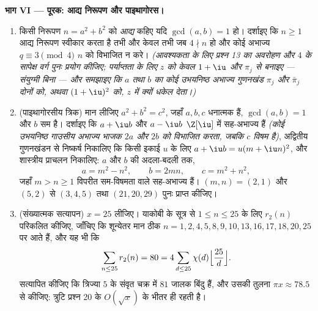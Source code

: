 \begin{problem}[{सप्ताहांत समस्या --- दो वर्गों के योग, $\Z[\iu]$ के
माध्यम से}]
\medskip
\noindent\textbf{भाग VI --- पूरक: आद्य निरूपण और पाइथागोरस।}
\begin{enumerate}[resume]
  \item किसी निरूपण $n = a^2 + b^2$ को \emph{आद्य} कहिए यदि $\gcd(a, b) = 1$ हो।
        दर्शाइए कि $n \geq 1$ आद्य निरूपण स्वीकार करता है तभी और केवल
        तभी जब $4 \nmid n$ हो और कोई अभाज्य $q \equiv 3 \pmod 4$ $n$ को विभाजित न
        करे। \emph{(आवश्यकता के लिए प्रश्न 13 का अवरोहण और
        $4$ के सापेक्ष वर्ग पुनः प्रयोग कीजिए; पर्याप्तता के
        लिए $z$ को केवल $1 + \iu$ और $\pi_j$ से बनाइए --- संयुग्मी
        बिना --- और समझाइए कि $a$ तथा $b$ का कोई उभयनिष्ठ
        अभाज्य गुणनखंड $\pi_j$ और $\bar\pi_j$ दोनों को, अथवा $(1+\iu)^2$ को,
        $z$ में क्यों धकेल देता।)}
  \item (पाइथागोरसीय त्रिक) मान लीजिए $a^2 + b^2 = c^2$, जहाँ $a, b,
        c$ धनात्मक
        हैं, $\gcd(a, b) = 1$ और $b$ सम है। दर्शाइए कि $a + \iu b$ और $a - \iu b$
        $\Z[\iu]$ में सह-अभाज्य हैं \emph{(कोई उभयनिष्ठ गाउसीय
        अभाज्य भाजक $2a$ और $2b$ को विभाजित करता, जबकि $c$
        विषम है)}, अद्वितीय गुणनखंडन से निष्कर्ष निकालिए कि
        किसी इकाई $u$ के लिए $a + \iu b = u(m + \iu n)^2$, और शास्त्रीय प्राचलन
        निकालिए: $a$ और $b$ की अदला-बदली तक,
        \[
        a = m^2 - n^2, \qquad b = 2mn, \qquad c = m^2 + n^2,
        \]
        जहाँ $m > n \geq 1$ विपरीत सम-विषमता वाले सह-अभाज्य हैं। $(m, n) =
        (2, 1)$
        और $(5, 2)$ से $(3, 4, 5)$ तथा $(21, 20, 29)$ पुनः प्राप्त कीजिए।
  \item (संख्यात्मक सत्यापन) $x = 25$ लीजिए। याकोबी के सूत्र से
        $1 \leq n \leq 25$ के लिए $r_2(n)$ परिकलित कीजिए, जाँचिए कि शून्येतर मान
        ठीक $n = 1,
        2, 4, 5, 8, 9, 10, 13, 16, 17, 18, 20, 25$ पर आते हैं, और यह भी कि
        \[
        \sum_{n \leq 25} r_2(n) = 80
        = 4\sum_{d \leq 25}\chi(d)
        \Bigl\lfloor\frac{25}d\Bigr\rfloor .
        \]
        सत्यापित कीजिए कि त्रिज्या $5$ के संवृत चक्र में $81$
        जालक बिंदु हैं, और उसकी तुलना $\pi x \approx 78.5$ से कीजिए: त्रुटि
        प्रश्न 20 के $O(\sqrt x)$ के भीतर ही रहती है।
\end{enumerate}
\end{problem}
